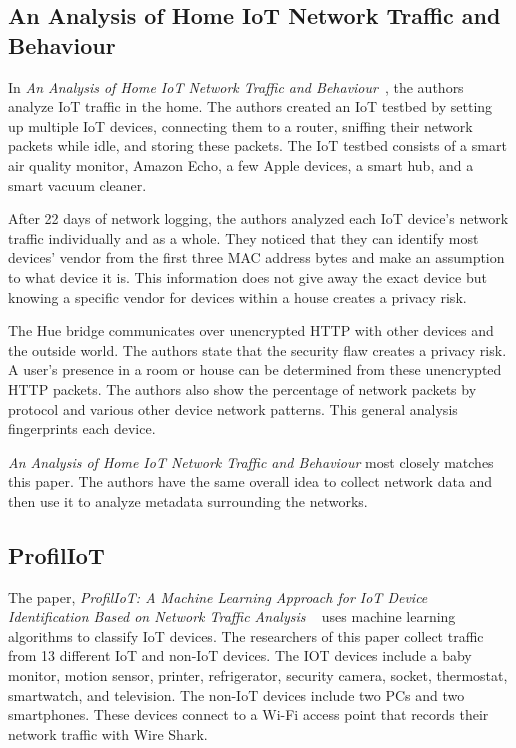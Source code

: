 \subsection{An Analysis of Home IoT Network Traffic and Behaviour}
\label{homeIoTPaper}
In \textit{An Analysis of Home IoT Network Traffic and Behaviour}~\cite{home_iot}, the authors analyze IoT traffic in the home. The authors created an IoT testbed by setting up multiple IoT devices, connecting them to a router, sniffing their network packets while idle, and storing these packets. The IoT testbed consists of a smart air quality monitor, Amazon Echo, a few Apple devices, a smart hub, and a smart vacuum cleaner.

After 22 days of network logging, the authors analyzed each IoT device's network traffic individually and as a whole. They noticed that they can identify most devices' vendor from the first three MAC address bytes and make an assumption to what device it is. This information does not give away the exact device but knowing a specific vendor for devices within a house creates a privacy risk.

The Hue bridge communicates over unencrypted HTTP with other devices and the outside world. The authors state that the security flaw creates a privacy risk. A user’s presence in a room or house can be determined from these unencrypted HTTP packets. The authors also show the percentage of network packets by protocol and various other device network patterns. This general analysis fingerprints each device.

\textit{An Analysis of Home IoT Network Traffic and Behaviour} most closely matches this paper. The authors have the same overall idea to collect network data and then use it to analyze metadata surrounding the networks.

\subsection{ProfilIoT}
\label{ProfilIoTPaper}
The paper, \textit{ProfilIoT: A Machine Learning Approach for IoT Device Identification Based on Network Traffic Analysis} ~\cite{Meidan:2017:PML:3019612.3019878} uses machine learning algorithms to classify IoT devices. The researchers of this paper collect traffic from 13 different IoT and non-IoT devices. The IOT devices include a baby monitor, motion sensor, printer, refrigerator, security camera, socket, thermostat, smartwatch, and television. The non-IoT devices include two PCs and two smartphones. These devices connect to a Wi-Fi access point that records their network traffic with Wire Shark\cite{wireshark}.

